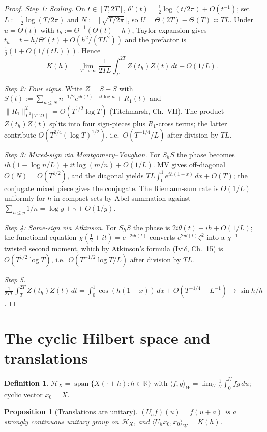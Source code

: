 \documentclass[11pt,reqno]{amsart}
\theoremstyle{plain}
\newtheorem{proposition}[theorem]{Proposition}
\theoremstyle{definition}
\newtheorem{definition}[theorem]{Definition}
\theoremstyle{remark}
\DeclareMathOperator{\spanop}{span}
\newcommand{\Hc}{\mathcal H}
\newcommand{\R}{\mathbb R}
\begin{document}
\begin{proof}
\emph{Step 1: Scaling.}
On \(t\in[T,2T]\),
\(\theta'(t)=\tfrac12\log(t/2\pi)+O(t^{-1})\); set
\(L:=\tfrac12\log(T/2\pi)\) and \(N:=\lfloor\sqrt{T/2\pi}\rfloor\), so
\(U=\Theta(2T)-\Theta(T)\asymp TL\). Under \(u=\Theta(t)\) with
\(t_h:=\Theta^{-1}(\Theta(t)+h)\), Taylor expansion gives
\(t_h=t+h/\Theta'(t)+O(h^2/(TL^2))\) and the prefactor is
\(\tfrac12(1+O(1/(tL)))\). Hence
\[
K(h)=\lim_{T\to\infty}\frac1{2TL}\int_T^{2T}Z(t_h)Z(t)\,dt+O(1/L).
\]

\emph{Step 2: Four signs.}
Write \(Z=S+\bar S\) with
\(S(t):=\sum_{n\le N}n^{-1/2}e^{i\theta(t)-it\log n}+R_1(t)\) and
\(\|R_1\|_{L^2[T,2T]}^2=O(T^{1/2}\log T)\) (Titchmarsh, Ch.~VII). The
product \(Z(t_h)Z(t)\) splits into four sign-pieces plus \(R_1\)-cross
terms; the latter contribute \(O(T^{3/4}(\log T)^{1/2})\), i.e.\
\(O(T^{-1/4}/L)\) after division by \(TL\).

\emph{Step 3: Mixed-sign via Montgomery--Vaughan.}
For \(S_h\bar S\) the phase becomes \(ih(1-\log n/L)+it\log(m/n)+O(1/L)\).
MV gives off-diagonal \(O(N)=O(T^{1/2})\), and the diagonal yields
\(TL\int_0^1 e^{ih(1-x)}\,dx+O(T)\); the conjugate mixed piece gives the
conjugate. The Riemann-sum rate is \(O(1/L)\) uniformly for \(h\) in
compact sets by Abel summation against \(\sum_{n\le y}1/n=\log y+\gamma+O(1/y)\).

\emph{Step 4: Same-sign via Atkinson.}
For \(S_hS\) the phase is \(2i\theta(t)+ih+O(1/L)\); the functional equation
\(\chi(\tfrac12+it)=e^{-2i\theta(t)}\) converts
\(e^{2i\theta(t)}\zeta^2\) into a \(\chi^{-1}\)-twisted second moment,
which by Atkinson's formula (Ivi\'c, Ch.~15) is \(O(T^{1/2}\log T)\),
i.e.\ \(O(T^{-1/2}\log T/L)\) after division by \(TL\).

\emph{Step 5.}
\(\frac1{2TL}\int_T^{2T}Z(t_h)Z(t)\,dt=\int_0^1\cos(h(1-x))\,dx+O(T^{-1/4}+L^{-1})\to\sin h/h\).
\end{proof}

\section{The cyclic Hilbert space and translations}

\begin{definition}
\(\Hc_X=\overline{\spanop\{X(\cdot+h):h\in\R\}}\) with
\(\langle f,g\rangle_W=\lim_U\tfrac1U\int_0^U f\bar g\,du\); cyclic vector
\(x_0=X\).
\end{definition}

\begin{proposition}[Translations are unitary]\label{prop:unitary}
\((U_af)(u)=f(u+a)\) is a strongly continuous unitary group on \(\Hc_X\),
and \(\langle U_hx_0,x_0\rangle_W=K(h)\).
\end{proposition}
\end{document}
